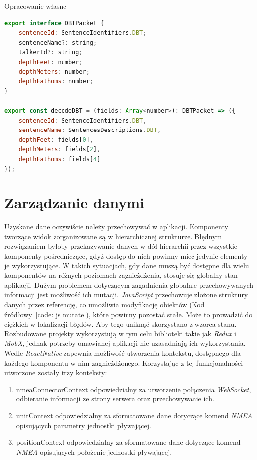 \documentclass[skorowidz,skroty]{dyplomWEZUT}
\begin{document}
{Opracowanie własne}{\label{code: DBT codec}}
\begin{lstlisting}[language=JavaScript]
export interface DBTPacket {
    sentenceId: SentenceIdentifiers.DBT;
    sentenceName?: string;
    talkerId?: string;
    depthFeet: number;
    depthMeters: number;
    depthFathoms: number;
}

export const decodeDBT = (fields: Array<number>): DBTPacket => ({
    sentenceId: SentenceIdentifiers.DBT,
    sentenceName: SentencesDescriptions.DBT,
    depthFeet: fields[0],
    depthMeters: fields[2],
    depthFathoms: fields[4]
});

\end{lstlisting}

\section{Zarządzanie danymi}\label{sec: server communication}
Uzyskane dane oczywiście należy przechowywać w aplikacji. Komponenty tworzące widok zorganizowane są w hierarchicznej strukturze. Błędnym rozwiązaniem byłoby przekazywanie danych w dół hierarchii przez wszystkie komponenty pośredniczące, gdyż dostęp do nich powinny mieć jedynie elementy je wykorzystujące. W takich sytuacjach, gdy dane muszą być dostępne dla wielu komponentów na różnych poziomach zagnieżdżenia, stosuje się globalny stan aplikacji. Dużym problemem dotyczącym zagadnienia globalnie przechowywanych informacji jest możliwość ich mutacji. \textit{JavaScript} przechowuje złożone struktury danych przez referencję, co umożliwia modyfikację obiektów (Kod źródłowy~\ref{code: js mutate}), które powinny pozostać stałe. Może to prowadzić do ciężkich w lokalizacji błędów. Aby tego uniknąć skorzystano z wzorca stanu. Rozbudowane projekty wykorzystują w tym celu biblioteki takie jak \textit{Redux} i \textit{MobX}, jednak potrzeby omawianej aplikacji nie uzasadniają ich wykorzystania. Wedle \cite{ReactNative} \textit{ReactNative} zapewnia możliwość utworzenia kontekstu, dostępnego dla każdego komponentu w nim zagnieżdżonego. Korzystając z tej funkcjonalności utworzone zostały trzy konteksty:

\begin{enumerate}
 \item nmeaConnectorContext odpowiedzialny za utworzenie połączenia \textit{WebSocket}, odbieranie informacji ze strony serwera oraz przechowywanie ich. 
 
 \item unitContext odpowiedzialny za sformatowane dane dotyczące komend \textit{NMEA} opisujących parametry jednostki pływającej. 
 
 \item positionContext odpowiedzialny za sformatowane dane dotyczące komend \textit{NMEA} opisujących położenie jednostki pływającej. 
 
\end{enumerate}
\end{document}
